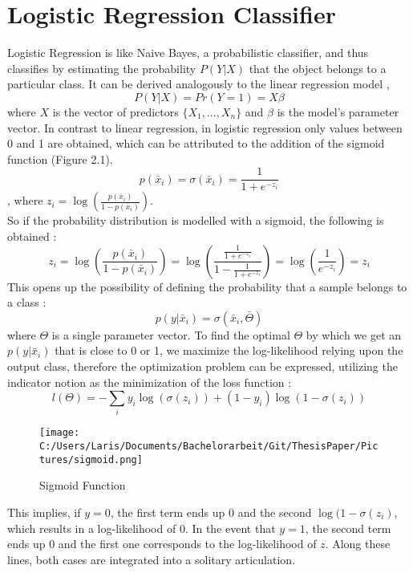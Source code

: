 \documentclass[a4paper, 11pt,titlepage,oneside,openany]{book}
\begin{document}
\section{Logistic Regression Classifier}
\noindent Logistic Regression is like Naive Bayes, a probabilistic classifier, and thus classifies by estimating the probability $P(Y|X)$ that the object belongs to a particular class.
It can be derived analogously to the linear regression model \cite{logisticregressionbook}, 
\[
P(Y|X)=Pr(Y=1)=X\beta
\]
where $X$ is the vector of predictors $\{X_1,...,X_n\}$ and $\beta$ is the model's parameter vector. In contrast to linear regression, in logistic regression only values between 0 and 1 are obtained, which can be attributed to the addition of the sigmoid function \cite{algorithms2} (Figure 2.1).
\[
p(\bar{x}_i)=\sigma(\bar{x}_i)=\frac{1}{1+e^{-z_i}}
\]
, where $z_i=\log(\frac{p(\bar{x}_i)}{1-p(\bar{x}_i)})$. \\
So if the probability distribution is modelled with a sigmoid, the following is obtained \cite{algorithms2}:
\[
z_i=\log(\frac{p(\bar{x}_i)}{1-p(\bar{x}_i)})=\log(\frac{\frac{1}{1+e^{-z_i}}}{1-\frac{1}{1+e^{-z_i}}})=\log(\frac{1}{e^{-z_i}})=z_i
\]
This opens up the possibility of defining the probability that a sample belongs to a class \cite{algorithms2}:
\[
p(y|\bar{x}_i)=\sigma(\bar{x}_i,\bar{\Theta})
\]
where $\Theta$ is a single parameter vector.
\noindent To find the optimal $\Theta$ by which we get an $p(y|\bar{x}_i)$ that is close to 0 or 1, we maximize the log-likelihood relying upon the output class, therefore the optimization problem can be expressed, utilizing the indicator notion as the minimization of the loss function \cite{algorithms}:
\[
l(\Theta)=-\sum_{i}y_i\log(\sigma(z_i))+(1-y_i)\log(1-\sigma(z_i))
\]
\begin{figure}[t]
	\centering
	\texttt{[image: C:/Users/Laris/Documents/Bachelorarbeit/Git/ThesisPaper/Pictures/sigmoid.png]}
	\caption{Sigmoid Function \cite{algorithms}}
\end{figure}
\noindent This implies, if $y=0$, the first term ends up $0$ and the second $\log(1-\sigma(z_i)$, which results in a log-likelihood of $0$. In the event that $y=1$, the second term ends up 0 and the first one corresponds to the log-likelihood of $z$. Along these lines, both cases are integrated into a solitary articulation. \\
\end{document}
